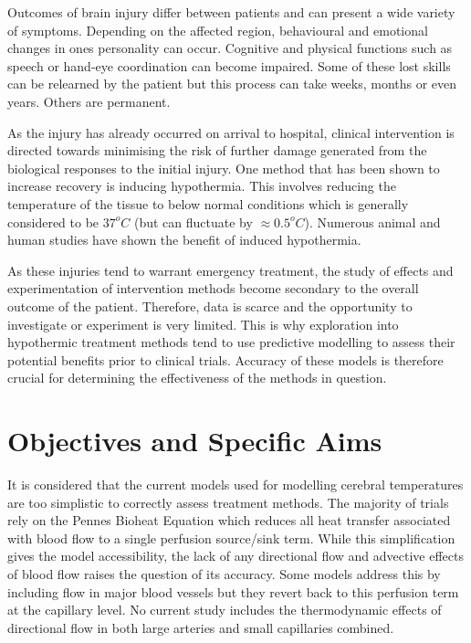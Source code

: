 \documentclass[11pt,english,a4paper,twoside,openright]{report}
\begin{document}
{{{{{{{{	Outcomes of brain injury differ between patients and can present a wide variety of symptoms. Depending on the affected region, behavioural and emotional changes in ones personality can occur. Cognitive and physical functions such as speech or hand-eye coordination can become impaired. Some of these lost skills can be relearned by the patient but this process can take weeks, months or even years. Others are permanent.
	
	As the injury has already occurred on arrival to hospital, clinical intervention is directed towards minimising the risk of further damage generated from the biological responses to the initial injury. One method that has been shown to increase recovery is inducing hypothermia. This involves reducing the temperature of the tissue to below normal conditions which is generally considered to be $37^{o}C$ (but can fluctuate by ${\approx}0.5^{o}C$). Numerous animal and human studies have shown the benefit of induced hypothermia.
	
	As these injuries tend to warrant emergency treatment, the study of effects and experimentation of intervention methods become secondary to the overall outcome of the patient. Therefore, data is scarce and the opportunity to investigate or experiment is very limited. This is why exploration into hypothermic treatment methods tend to use predictive modelling to assess their potential benefits prior to clinical trials. Accuracy of these models is therefore crucial for determining the effectiveness of the methods in question. 
	
	\section[Objectives and Specific Aims]{{\Large O}bjectives and {\Large S}pecific {\Large A}ims}
	
	It is considered that the current models used for modelling cerebral temperatures are too simplistic to correctly assess treatment methods. The majority of trials rely on the Pennes Bioheat Equation \cite{pennes1948analysis} which reduces all heat transfer associated with blood flow to a single perfusion source/sink term. While this simplification gives the model accessibility, the lack of any directional flow and advective effects of blood flow raises the question of its accuracy. Some models address this by including flow in major blood vessels but they revert back to this perfusion term at the capillary level. No current study includes the thermodynamic effects of directional flow in both large arteries and small capillaries combined.
	
}}}}}}}}
\end{document}
